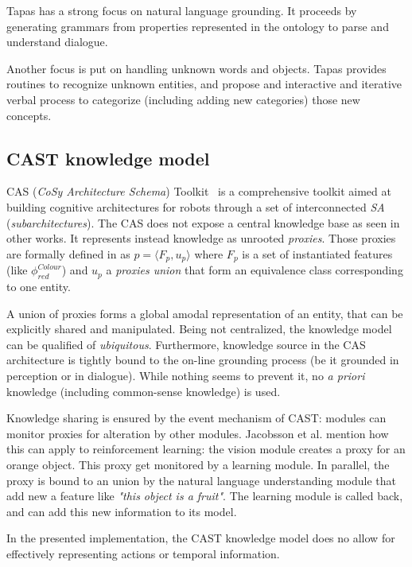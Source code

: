 {\sc Tapas} has a strong focus on natural language grounding. It proceeds by
generating grammars from properties represented in the ontology to parse and
understand dialogue.

Another focus is put on handling unknown words and objects. {\sc Tapas}
provides routines to recognize unknown entities, and propose and interactive
and iterative verbal process to categorize (including adding new categories)
those new concepts.


\subsection{CAST knowledge model}
\label{sect|cast}

CAS (\emph{CoSy Architecture Schema}) Toolkit~\cite{Hawes2007} is a
comprehensive toolkit aimed at building cognitive architectures for robots
through a set of interconnected \emph{SA} (\emph{subarchitectures}). The CAS does not
expose a central knowledge base as seen in other works. It represents instead knowledge as unrooted \emph{proxies}. Those proxies are formally
defined in \cite{Jacobsson2008} as $p= \langle F_p, u_p \rangle$ where $F_p$ is
a set of instantiated features (like $\phi^{Colour}_{red}$) and $u_p$ a
\emph{proxies union} that form an equivalence class corresponding to one
entity.

A union of proxies forms a global amodal representation of an entity, that can
be explicitly shared and manipulated. Being not centralized, the knowledge
model can be qualified of \emph{ubiquitous}. Furthermore, knowledge source in
the CAS architecture is tightly bound to the on-line grounding process (be it
grounded in perception or in dialogue). While nothing seems to prevent it, no
{\it a priori} knowledge (including common-sense knowledge) is used.

Knowledge sharing is ensured by the event mechanism of CAST: modules can
monitor proxies for alteration by other modules. Jacobsson et al. mention how
this can apply to reinforcement learning: the vision module creates a proxy for
an orange object. This proxy get monitored by a learning module. In parallel,
the proxy is bound to an union by the natural language understanding module
that add new a feature like \emph{"this object is a fruit"}. The learning
module is called back, and can add this new information to its model.

In the presented implementation, the CAST knowledge model does no allow for
effectively representing actions or temporal information.

